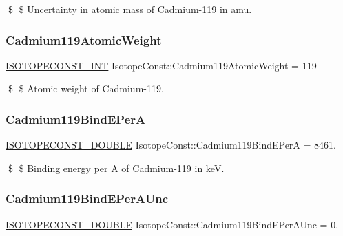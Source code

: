 \$ \$ Uncertainty in atomic mass of Cadmium-\/119 in amu. \mbox{\label{group___isotope_const-_cadmium-_cd119_ga698ffcf8f665f41d41ab762780701446}} 
\subsubsection{\texorpdfstring{Cadmium119\+Atomic\+Weight}{Cadmium119AtomicWeight}}
{\footnotesize\ttfamily \mbox{\hyperlink{group___isotope_const-_macros_ga5f18360b3e99483a35c32d789e62621c}{I\+S\+O\+T\+O\+P\+E\+C\+O\+N\+S\+T\+\_\+\+I\+NT}} Isotope\+Const\+::\+Cadmium119\+Atomic\+Weight = 119}

\$ \$ Atomic weight of Cadmium-\/119. \mbox{\label{group___isotope_const-_cadmium-_cd119_ga3b7b6ad26fa2c415582107cd35192c7a}} 
\subsubsection{\texorpdfstring{Cadmium119\+Bind\+E\+PerA}{Cadmium119BindEPerA}}
{\footnotesize\ttfamily \mbox{\hyperlink{group___isotope_const-_macros_ga8f45a7272ce02c0b4c65c44636ed719a}{I\+S\+O\+T\+O\+P\+E\+C\+O\+N\+S\+T\+\_\+\+D\+O\+U\+B\+LE}} Isotope\+Const\+::\+Cadmium119\+Bind\+E\+PerA = 8461.}

\$ \$ Binding energy per A of Cadmium-\/119 in keV. \mbox{\label{group___isotope_const-_cadmium-_cd119_ga730ec4cb52dd85592cd6963392438065}} 
\subsubsection{\texorpdfstring{Cadmium119\+Bind\+E\+Per\+A\+Unc}{Cadmium119BindEPerAUnc}}
{\footnotesize\ttfamily \mbox{\hyperlink{group___isotope_const-_macros_ga8f45a7272ce02c0b4c65c44636ed719a}{I\+S\+O\+T\+O\+P\+E\+C\+O\+N\+S\+T\+\_\+\+D\+O\+U\+B\+LE}} Isotope\+Const\+::\+Cadmium119\+Bind\+E\+Per\+A\+Unc = 0.}

